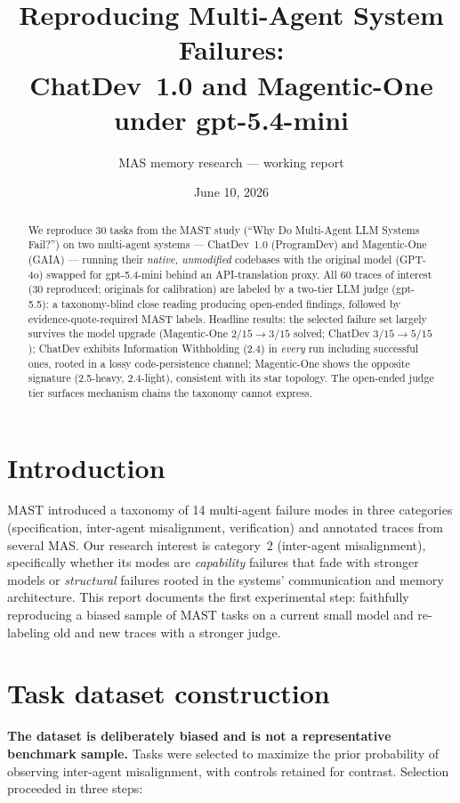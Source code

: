 \documentclass[11pt]{article}
\title{Reproducing Multi-Agent System Failures:\\
ChatDev~1.0 and Magentic-One under gpt-5.4-mini}
\author{MAS memory research --- working report}
\date{June 10, 2026}
\begin{document}
\maketitle

\begin{abstract}
We reproduce 30 tasks from the MAST study (``Why Do Multi-Agent LLM Systems
Fail?'') on two multi-agent systems --- ChatDev~1.0 (ProgramDev) and
Magentic-One (GAIA) --- running their \emph{native, unmodified} codebases with
the original model (GPT-4o) swapped for gpt-5.4-mini behind an API-translation
proxy. All 60 traces of interest (30 reproduced; originals for calibration)
are labeled by a two-tier LLM judge (gpt-5.5): a taxonomy-blind close reading
producing open-ended findings, followed by evidence-quote-required MAST
labels. Headline results: the selected failure set largely survives the model
upgrade (Magentic-One $2/15 \to 3/15$ solved; ChatDev $3/15 \to 5/15$);
ChatDev exhibits Information Withholding (2.4) in \emph{every} run including
successful ones, rooted in a lossy code-persistence channel; Magentic-One
shows the opposite signature (2.5-heavy, 2.4-light), consistent with its star
topology. The open-ended judge tier surfaces mechanism chains the taxonomy
cannot express.
\end{abstract}

\section{Introduction}

MAST \cite{mast} introduced a taxonomy of 14 multi-agent failure modes in
three categories (specification, inter-agent misalignment, verification) and
annotated traces from several MAS. Our research interest is category~2
(inter-agent misalignment), specifically whether its modes are
\emph{capability} failures that fade with stronger models or
\emph{structural} failures rooted in the systems' communication and memory
architecture. This report documents the first experimental step: faithfully
reproducing a biased sample of MAST tasks on a current small model and
re-labeling old and new traces with a stronger judge.

\section{Task dataset construction}\label{sec:dataset}

\textbf{The dataset is deliberately biased and is not a representative
benchmark sample.} Tasks were selected to maximize the prior probability of
observing inter-agent misalignment, with controls retained for contrast.
Selection proceeded in three steps:
\end{document}
